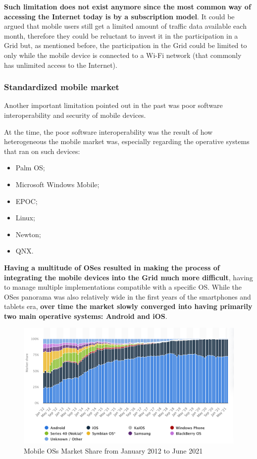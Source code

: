 \textbf{Such limitation does not exist anymore since the most common way of accessing the Internet today is by a subscription model}. It could be argued that mobile users still get a limited amount of traffic data available each month, therefore they could be reluctant to invest it in the participation in a Grid but, as mentioned before, the participation in the Grid could be limited to only while the mobile device is connected to a Wi-Fi network (that commonly has unlimited access to the Internet).

\subsubsection{Standardized mobile market}
Another important limitation pointed out in the past was poor software interoperability and security of 
mobile devices.

At the time, the poor software interoperability was the result of how heterogeneous the mobile market was, especially regarding the operative systems that ran on such devices:
\begin{itemize}
    \item Palm OS;
    \item Microsoft Windows Mobile;
    \item EPOC;
    \item Linux;
    \item Newton;
    \item QNX.
\end{itemize}
\textbf{Having a multitude of OSes resulted in making the process of integrating the mobile devices into the Grid much more difficult}, having to manage multiple implementations compatible with a specific OS. While the OSes panorama was also relatively wide in the first years of the smartphones and tablets era, \textbf{over time the market slowly converged into having primarily two main operative systems: Android and iOS}.

\begin{figure}[!ht]
    \centering
    \includegraphics[scale=0.31]{document/chapters/chapter_1/images/os_market_share_2012_to_2021.png}
    \caption{Mobile OSs Market Share from January 2012 to June 2021 \cite{mobile_and_desktop_os_market}}
    \label{fig:os_market_share_2012_to_2021}
\end{figure}

